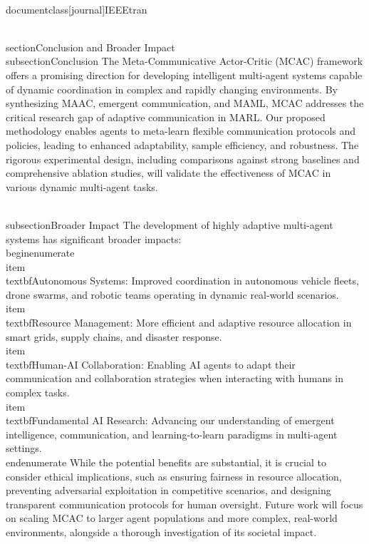 \\documentclass[journal]{IEEEtran}
\begin{document}
\\section{Conclusion and Broader Impact}
\\subsection{Conclusion}
The Meta-Communicative Actor-Critic (MCAC) framework offers a promising direction for developing intelligent multi-agent systems capable of dynamic coordination in complex and rapidly changing environments. By synthesizing MAAC, emergent communication, and MAML, MCAC addresses the critical research gap of adaptive communication in MARL. Our proposed methodology enables agents to meta-learn flexible communication protocols and policies, leading to enhanced adaptability, sample efficiency, and robustness. The rigorous experimental design, including comparisons against strong baselines and comprehensive ablation studies, will validate the effectiveness of MCAC in various dynamic multi-agent tasks.

\\subsection{Broader Impact}
The development of highly adaptive multi-agent systems has significant broader impacts:
\\begin{enumerate}
    \\item \\textbf{Autonomous Systems}: Improved coordination in autonomous vehicle fleets, drone swarms, and robotic teams operating in dynamic real-world scenarios.
    \\item \\textbf{Resource Management}: More efficient and adaptive resource allocation in smart grids, supply chains, and disaster response.
    \\item \\textbf{Human-AI Collaboration}: Enabling AI agents to adapt their communication and collaboration strategies when interacting with humans in complex tasks.
    \\item \\textbf{Fundamental AI Research}: Advancing our understanding of emergent intelligence, communication, and learning-to-learn paradigms in multi-agent settings.
\\end{enumerate}
While the potential benefits are substantial, it is crucial to consider ethical implications, such as ensuring fairness in resource allocation, preventing adversarial exploitation in competitive scenarios, and designing transparent communication protocols for human oversight. Future work will focus on scaling MCAC to larger agent populations and more complex, real-world environments, alongside a thorough investigation of its societal impact.
\end{document}
